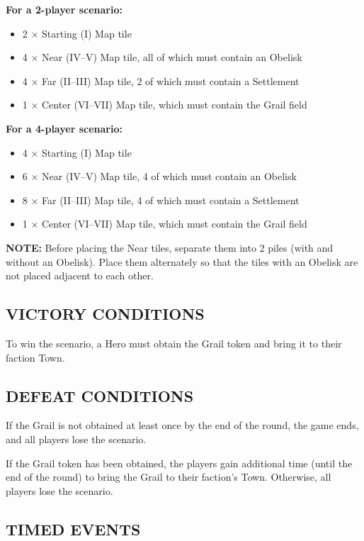 \begin{multicols*}{2}
\textbf{For a 2-player scenario:}
\begin{itemize}
  \item 2 × Starting (I) Map tile
  \item 4 × Near (IV--V) Map tile, all of which must contain an Obelisk
  \item 4 × Far (II--III) Map tile, 2 of which must contain a Settlement
  \item 1 × Center (VI--VII) Map tile, which must contain the Grail field
\end{itemize}

\textbf{For a 4-player scenario:}
\begin{itemize}
  \item 4 × Starting (I) Map tile
  \item 6 × Near (IV--V) Map tile, 4 of which must contain an Obelisk
  \item 8 × Far (II--III) Map tile, 4 of which must contain a Settlement
  \item 1 × Center (VI--VII) Map tile, which must contain the Grail field
\end{itemize}

\textbf{\MakeUppercase{Note:}} Before placing the Near tiles, separate them into 2 piles (with and without an Obelisk). Place them alternately so that the tiles with an Obelisk are not placed adjacent to each other.

\subsection*{\MakeUppercase{Victory Conditions}}
To win the scenario, a Hero must obtain the Grail token and bring it to their faction Town.

\subsection*{\MakeUppercase{Defeat Conditions}}
If the Grail is not obtained at least once by the end of the  round, the game ends, and all players lose the scenario.

If the Grail token has been obtained, the players gain additional time (until the end of the  round) to bring the Grail to their faction's Town. Otherwise, all players lose the scenario.

\subsection*{\MakeUppercase{Timed Events}}


\end{multicols*}
